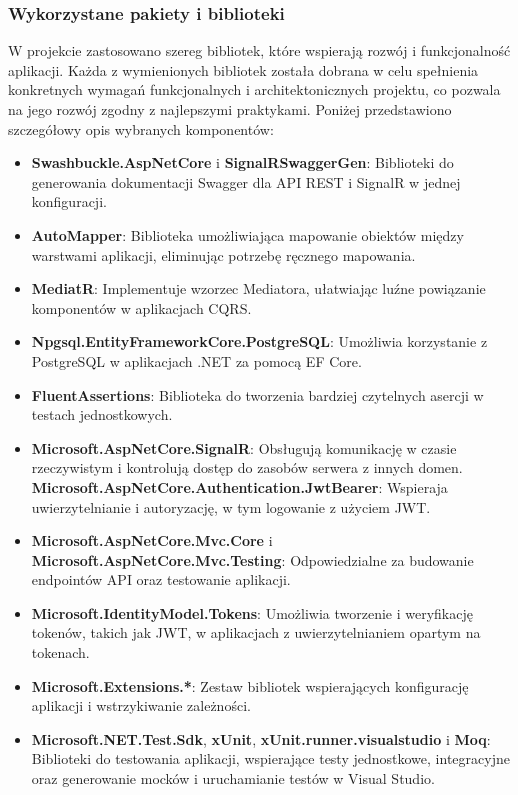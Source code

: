 \documentclass[twoside]{projektInzynierskiMS1}
\begin{document}
\newpage

\subsubsection{Wykorzystane pakiety i biblioteki}

\noindent
W projekcie zastosowano szereg bibliotek, które wspierają rozwój i funkcjonalność aplikacji. Każda z wymienionych bibliotek została dobrana w celu spełnienia konkretnych wymagań funkcjonalnych i architektonicznych projektu, co pozwala na jego rozwój zgodny z najlepszymi praktykami. Poniżej przedstawiono szczegółowy opis wybranych komponentów:

\begin{itemize} 
    \item \textbf{Swashbuckle.AspNetCore} i \textbf{SignalRSwaggerGen}: Biblioteki do generowania dokumentacji Swagger dla API REST i SignalR w jednej konfiguracji.
    \item \textbf{AutoMapper}: Biblioteka umożliwiająca mapowanie obiektów między warstwami aplikacji, eliminując potrzebę ręcznego mapowania.
    \item \textbf{MediatR}: Implementuje wzorzec Mediatora, ułatwiając luźne powiązanie komponentów w aplikacjach CQRS.
    \item \textbf{Npgsql.EntityFrameworkCore.PostgreSQL}: Umożliwia korzystanie z PostgreSQL w aplikacjach .NET za pomocą EF Core.
    \item \textbf{FluentAssertions}: Biblioteka do tworzenia bardziej czytelnych asercji w testach jednostkowych.
    \item \textbf{Microsoft.AspNetCore.SignalR}: Obsługują komunikację w czasie rzeczywistym i kontrolują dostęp do zasobów serwera z innych domen.
    \textbf{Microsoft.AspNetCore.Authentication.JwtBearer}: Wspieraja uwierzytelnianie i autoryzację, w tym logowanie z użyciem JWT.
    \item \textbf{Microsoft.AspNetCore.Mvc.Core} i \textbf{Microsoft.AspNetCore.Mvc.Testing}: Odpowiedzialne za budowanie endpointów API oraz testowanie aplikacji.
    \item \textbf{Microsoft.IdentityModel.Tokens}: Umożliwia tworzenie i weryfikację tokenów, takich jak JWT, w aplikacjach z uwierzytelnianiem opartym na tokenach.
    \item \textbf{Microsoft.Extensions.*}: Zestaw bibliotek wspierających konfigurację aplikacji i wstrzykiwanie zależności.
    \item \textbf{Microsoft.NET.Test.Sdk}, \textbf{xUnit}, \textbf{xUnit.runner.visualstudio} i \textbf{Moq}: Biblioteki do testowania aplikacji, wspierające testy jednostkowe, integracyjne oraz generowanie mocków i uruchamianie testów w Visual Studio.
\end{itemize}
\end{document}
